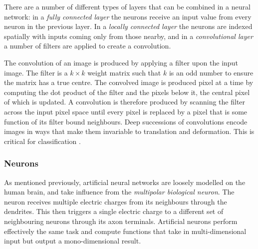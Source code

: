 \documentclass[a4paper,11pt,titlepage]{article}
\begin{document}
		\par 
		There are a number of different types of layers that can be combined in a neural network: in a \textit{fully connected layer} the neurons receive an input value from every neuron in the previous layer. In a \textit{locally connected layer} the neurons are indexed spatially with inputs coming only from those nearby, and in a \textit{convolutional layer} a number of filters are applied to create a convolution. 
		\par
		The convolution of an image is produced by applying a filter upon the input image. The filter is a $k \times k$ weight matrix such that $ k $ is an odd number to ensure the matrix has a true centre. The convolved image is produced pixel at a time by computing the dot product of the filter and the pixels below it, the central pixel of which is updated. A convolution is therefore produced by scanning the filter across the input pixel space until every pixel is replaced by a pixel that is some function of its filter bound neighbours. Deep successions of convolutions encode images in ways that make them invariable to translation and deformation. This is critical for classification \cite{Bruna2012}.

\subsubsection{Neurons}
		
		\begin{figure}[H]
    			\centering	
    			\qquad
    			\caption{ }%
    			\label{fig:biologicalNeurons}
		\end{figure}
				
		As mentioned previously, artificial neural networks are loosely modelled on the human brain, and take influence from the \textit{multipolar biological neuron}. The neuron receives multiple electric charges from its neighbours through the dendrites. This then triggers a single electric charge to a different set of neighbouring neurons through its axon terminals. Artificial neurons perform effectively the same task and compute functions that take in multi-dimensional input but output a mono-dimensional result.
\\
\end{document}
